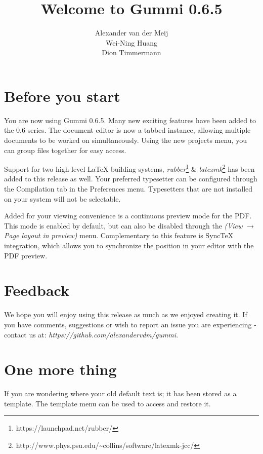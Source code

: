 \documentclass[11pt]{homework}
\title{\textbf{Welcome to Gummi 0.6.5}}
\author{Alexander van der Meij\\
		Wei-Ning Huang\\
		Dion Timmermann}
\date{}
\begin{document}
\maketitle

\section{Before you start}

You are now using Gummi 0.6.5. Many new exciting features have been added to the 0.6 series. The document editor is now a tabbed instance, allowing multiple documents to be worked on simultaneously. Using the new projects menu, you can group files together for easy access. 

Support for two high-level {\LaTeX} building systems, \emph{rubber}\footnote{https://launchpad.net/rubber/} \& \emph{latexmk}\footnote{http://www.phys.psu.edu/{\textasciitilde}collins/software/latexmk-jcc/} has been added to this release as well. Your preferred typesetter can be configured through the Compilation tab in the Preferences menu. Typesetters that are not installed on your system will not be selectable. 

Added for your viewing convenience is a continuous preview mode for the PDF. This mode is enabled by default, but can also be disabled through the \emph{(View $\rightarrow$ Page layout in preview)} menu. Complementary to this feature is SyncTeX integration, which allows you to synchronize the position in your editor with the PDF preview. 

\section{Feedback}
We hope you will enjoy using this release as much as we enjoyed creating it. If you have comments, suggestions or wish to report an issue you are experiencing - contact us at: \emph{https://github.com/alexandervdm/gummi}.

\section{One more thing}
If you are wondering where your old default text is; it has been stored as a template. The template menu can be used to access and restore it. 
\end{document}
